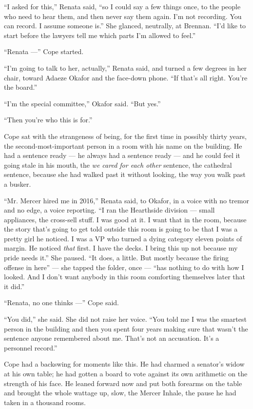 \documentclass[11pt,openany]{book}
\newcommand{\scenebreak}{\par\vspace{0.5\baselineskip}\begin{center}\textasteriskcentered\quad\textasteriskcentered\quad\textasteriskcentered\end{center}\vspace{0.5\baselineskip}\par}
\begin{document}
\scenebreak


``I asked for this,'' Renata said, ``so I could say a few things once, to the people who need to hear them, and then never say them again. I'm not recording. You can record. I assume someone is.'' She glanced, neutrally, at Brennan. ``I'd like to start before the lawyers tell me which parts I'm allowed to feel.''

``Renata ---'' Cope started.

``I'm going to talk to her, actually,'' Renata said, and turned a few degrees in her chair, toward Adaeze Okafor and the face-down phone. ``If that's all right. You're the board.''

``I'm the special committee,'' Okafor said. ``But yes.''

``Then you're who this is for.''

Cope sat with the strangeness of being, for the first time in possibly thirty years, the second-most-important person in a room with his name on the building. He had a sentence ready --- he always had a sentence ready --- and he could feel it going stale in his mouth, the \textit{we cared for each other} sentence, the cathedral sentence, because she had walked past it without looking, the way you walk past a busker.

``Mr. Mercer hired me in 2016,'' Renata said, to Okafor, in a voice with no tremor and no edge, a voice reporting. ``I ran the Hearthside division --- small appliances, the cross-sell stuff. I was good at it. I want that in the room, because the story that's going to get told outside this room is going to be that I was a pretty girl he noticed. I was a VP who turned a dying category eleven points of margin. He noticed \textit{that} first. I have the decks. I bring this up not because my pride needs it.'' She paused. ``It does, a little. But mostly because the firing offense in here'' --- she tapped the folder, once --- ``has nothing to do with how I looked. And I don't want anybody in this room comforting themselves later that it did.''

``Renata, no one thinks ---'' Cope said.

``You did,'' she said. She did not raise her voice. ``You told me I was the smartest person in the building and then you spent four years making sure that wasn't the sentence anyone remembered about me. That's not an accusation. It's a personnel record.''


\scenebreak


Cope had a backswing for moments like this. He had charmed a senator's widow at his own table; he had gotten a board to vote against its own arithmetic on the strength of his face. He leaned forward now and put both forearms on the table and brought the whole wattage up, slow, the Mercer Inhale, the pause he had taken in a thousand rooms.
\end{document}
